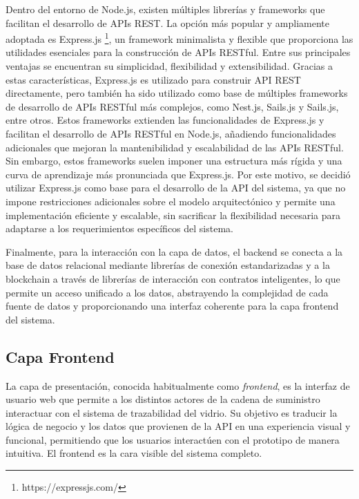 Dentro del entorno de Node.js, existen múltiples librerías y frameworks que facilitan el desarrollo de APIs REST. La opción más popular y ampliamente adoptada es Express.js \footnote{https://expressjs.com/}, un framework minimalista y flexible que proporciona las utilidades esenciales para la construcción de APIs RESTful. Entre sus principales ventajas se encuentran su simplicidad, flexibilidad y extensibilidad. Gracias a estas características, Express.js es utilizado para construir API REST directamente, pero también ha sido utilizado como base de múltiples frameworks de desarrollo de APIs RESTful más complejos, como Nest.js, Sails.js y Sails.js, entre otros. Estos frameworks extienden las funcionalidades de Express.js y facilitan el desarrollo de APIs RESTful en Node.js, añadiendo funcionalidades adicionales que mejoran la mantenibilidad y escalabilidad de las APIs RESTful. Sin embargo, estos frameworks suelen imponer una estructura más rígida y una curva de aprendizaje más pronunciada que Express.js. Por este motivo, se decidió utilizar Express.js como base para el desarrollo de la API del sistema, ya que no impone restricciones adicionales sobre el modelo arquitectónico y permite una implementación eficiente y escalable, sin sacrificar la flexibilidad necesaria para adaptarse a los requerimientos específicos del sistema.

Finalmente, para la interacción con la capa de datos, el backend se conecta a la base de datos relacional mediante librerías de conexión estandarizadas y a la blockchain a través de librerías de interacción con contratos inteligentes, lo que permite un acceso unificado a los datos, abstrayendo la complejidad de cada fuente de datos y proporcionando una interfaz coherente para la capa frontend del sistema.

\subsection{Capa Frontend}

La capa de presentación, conocida habitualmente como \textit{frontend}, es la interfaz de usuario web que permite a los distintos actores de la cadena de suministro interactuar con el sistema de trazabilidad del vidrio. Su objetivo es traducir la lógica de negocio y los datos que provienen de la API en una experiencia visual y funcional, permitiendo que los usuarios interactúen con el prototipo de manera intuitiva. El frontend es la cara visible del sistema completo.

